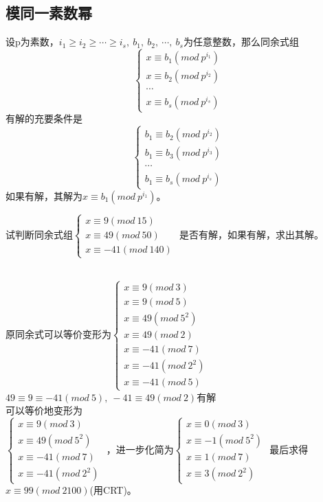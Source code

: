 \documentclass[cn,10pt]{elegantbook}
\begin{document}
\subsection{模同一素数幂}
\begin{theorem}
  设p为素数，$i_1 \geq i_2 \geq \cdots \geq i_s,\ b_1,\ b_2,\ \cdots ,\ b_s$为任意整数，那么同余式组
  \[
    \left\{
      \begin{matrix}
        x \equiv b_1(mod\ p^{i_1})
        \\ x \equiv b_2(mod\ p^{i_2})
        \\ \cdots
        \\ x \equiv b_s(mod\ p^{i_s})
      \end{matrix}
    \right.
  \]
  有解的充要条件是
  \[\left\{
    \begin{matrix}
      b_1 \equiv b_2(mod\ p^{i_2})
    \\b_1 \equiv b_3(mod\ p^{i_3})
    \\ \cdots
    \\ b_1 \equiv b_s(mod\ p^{i_s})
    \end{matrix}
  \right.\]
  如果有解，其解为$x \equiv b_1(mod\ p^{i_1})$。
\end{theorem}
\begin{example}
  试判断同余式组$\begin{cases}
    x \equiv 9(mod\ 15)
    \\ x \equiv 49(mod\ 50)
    \\x \equiv -41(mod\ 140)
  \end{cases}$
  是否有解，如果有解，求出其解。
\end{example}
\begin{solution}
  \\ 原同余式可以等价变形为$\begin{cases}
    x \equiv 9(mod\ 3)
    \\x \equiv 9(mod\ 5)
    \\x \equiv 49(mod\ 5^2)
    \\x \equiv 49(mod\ 2)
    \\x \equiv -41(mod\ 7)
    \\x \equiv -41(mod\ 2^2)
    \\x \equiv -41(mod\ 5)
  \end{cases}$
  \\ $49 \equiv 9 \equiv -41(mod\ 5),\ -41 \equiv 49(mod\ 2)$有解
  \\ 可以等价地变形为
  \\$\begin{cases}
    x \equiv 9(mod\ 3)
    \\ x \equiv 49(mod\ 5^2)
    \\ x \equiv -41(mod\ 7)
    \\ x \equiv -41(mod\ 2^2)
  \end{cases}$
  ，进一步化简为$\begin{cases}
    x \equiv 0(mod\ 3)
    \\x \equiv -1(mod\ 5^2)
    \\x \equiv 1(mod\ 7)
    \\x \equiv 3(mod\ 2^2)
  \end{cases}$
  最后求得$x \equiv 99(mod\ 2100)$(用CRT)。
\end{solution}
\end{document}
